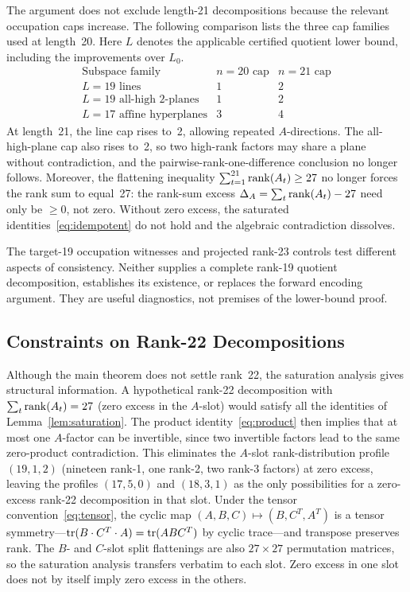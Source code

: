 \documentclass[11pt,a4paper]{article}
\begin{document}
The argument does not exclude length-21 decompositions because the relevant
occupation caps increase. The following comparison lists the three cap
families used at length~20. Here $L$ denotes the applicable certified
quotient lower bound, including the improvements over $L_0$.
\[
  \begin{array}{c|cc}
    \text{Subspace family} & n=20\text{ cap} & n=21\text{ cap} \\ \hline
    L=19\text{ lines} & 1 & 2 \\
    L=19\text{ all-high 2-planes} & 1 & 2 \\
    L=17\text{ affine hyperplanes} & 3 & 4
  \end{array}
\]
At length~21, the line cap rises to~2, allowing repeated $A$-directions.  The all-high-plane cap also rises to~2, so two high-rank factors may share a plane without contradiction, and the pairwise-rank-one-difference conclusion no longer follows.  Moreover, the flattening inequality $\sum_{t=1}^{21}\operatorname{rank}(A_t)\ge 27$ no longer forces the rank sum to equal~27: the rank-sum excess $\Delta_A=\sum_t\operatorname{rank}(A_t)-27$ need only be $\ge 0$, not zero.  Without zero excess, the saturated identities~\eqref{eq:idempotent} do not hold and the algebraic contradiction dissolves.

The target-19 occupation witnesses and projected rank-23 controls test different aspects of consistency. Neither supplies a complete rank-19 quotient decomposition, establishes its existence, or replaces the forward encoding argument. They are useful diagnostics, not premises of the lower-bound proof.

\subsection{Constraints on Rank-22 Decompositions}

Although the main theorem does not settle rank~22, the saturation analysis gives structural information.  A hypothetical rank-22 decomposition with $\sum_t\operatorname{rank}(A_t)=27$ (zero excess in the $A$-slot) would satisfy all the identities of Lemma~\ref{lem:saturation}.  The product identity~\eqref{eq:product} then implies that at most one $A$-factor can be invertible, since two invertible factors lead to the same zero-product contradiction.  This eliminates the $A$-slot rank-distribution profile $(19,1,2)$ (nineteen rank-1, one rank-2, two rank-3 factors) at zero excess, leaving the profiles $(17,5,0)$ and $(18,3,1)$ as the only possibilities for a zero-excess rank-22 decomposition in that slot.  Under the tensor convention~\eqref{eq:tensor}, the cyclic map $(A,B,C)\mapsto(B,C^T,A^T)$ is a tensor symmetry---$\operatorname{tr}(B\cdot C^T\cdot A)=\operatorname{tr}(ABC^T)$ by cyclic trace---and transpose preserves rank.  The $B$- and $C$-slot split flattenings are also $27\times 27$ permutation matrices, so the saturation analysis transfers verbatim to each slot.  Zero excess in one slot does not by itself imply zero excess in the others.
\end{document}
